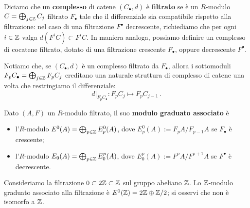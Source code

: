 \begin{df}
	Diciamo che un \textbf{complesso} di catene $(C_{\bullet}, d)$ è \textbf{filtrato}
	se è un $R$-modulo $C = \bigoplus_{j \in {\mathbb Z}} C_{j}$ filtrato $F_{\bullet}$ tale
	che il differenziale sia compatibile rispetto alla filtrazione: 
	nel caso di una filtrazione $F^{\bullet}$ decrescente,
	richiediamo che per ogni $i \in {\mathbb Z}$ valga
	 $d\left(F^{i}C\right) \subset F^{i}C$.
	 In maniera analoga, possiamo definire un complesso di cocatene filtrato,
	 dotato di una filtrazione crescente $F_{\bullet}$, 
	 oppure decrescente $F^{\bullet}$.
\end{df}

	Notiamo che, se $(C_{\bullet},d)$ è un complesso filtrato da $F_{\bullet}$,
	allora i sottomoduli $F_{p}C_{\bullet}=\bigoplus_{j \in {\mathbb Z}}F_{p}C_{j}$
	ereditano una naturale struttura di complesso di catene
	una volta che restringiamo il differenziale:
	\begin{equation*}
		d\vert_{F_{p}C_{\bullet}} : F_{p}C_{j} \longmapsto F_{p}C_{j-1}\,.
	\end{equation*}

\begin{df}
	Dato $(A,F)$ un $R$-modulo filtrato, il suo \textbf{modulo graduato associato} è
	\begin{itemize}
		\item l'$R$-modulo $E^{0}(A) = \bigoplus_{p \in {\mathbb Z}} E^{0}_{p}(A)$, 
		dove $E^{0}_{p}(A) := F_{p}A/F_{p-1}A$ se $F_{\bullet}$ è crescente;
		
		\item l'$R$-modulo $E_{0}(A) = \bigoplus_{p \in {\mathbb Z}} E_{0}^{p}(A)$, 
		dove $E^{p}_{0}(A) := F^{p}A/F^{p+1}A$ se $F^{\bullet}$ è decrescente.
	\end{itemize}
\end{df}

\begin{ex}
	Consideriamo la filtrazione $0 \subset 2{\mathbb Z} \subset {\mathbb Z}$ sul gruppo abeliano ${\mathbb Z}$.
	Lo ${\mathbb Z}$-modulo graduato associato alla filtrazione è $E^{0}({\mathbb Z})=2{\mathbb Z} \oplus {\mathbb Z}/2$;
	si osservi che non è isomorfo a ${\mathbb Z}$.
\end{ex}

